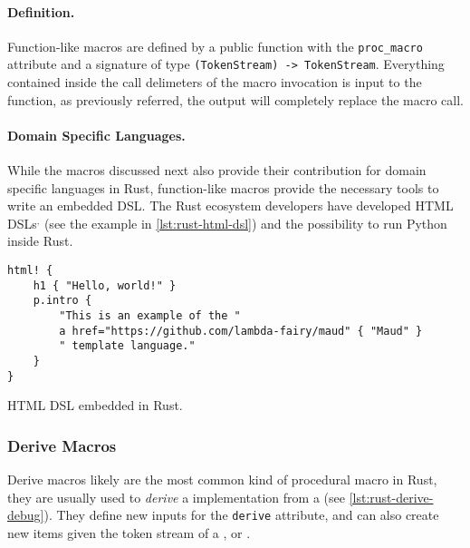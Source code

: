 \paragraph{Definition.}
Function-like macros are defined by a public function with the \texttt{proc\_macro} attribute and
a signature of type \texttt{(TokenStream) -> TokenStream}.
Everything contained inside the call delimeters of the macro invocation is input to the function,
as previously referred, the output will completely replace the macro call.

\paragraph{Domain Specific Languages.}
While the macros discussed next also provide their contribution for domain specific languages in Rust,
function-like macros provide the necessary tools to write an embedded DSL.
The Rust ecosystem developers have developed HTML DSLs$^,$
(see the example in \autoref{lst:rust-html-dsl}) and
the possibility to run Python inside Rust.

% 
\begin{listing}
    \begin{verbatim}
html! {
    h1 { "Hello, world!" }
    p.intro {
        "This is an example of the "
        a href="https://github.com/lambda-fairy/maud" { "Maud" }
        " template language."
    }
}
    \end{verbatim}
    \caption[HTML DSL embedded in Rust.]{HTML DSL embedded in Rust.\footnotemark}
    \label{lst:rust-html-dsl}
\end{listing}

\subsubsection*{Derive Macros}\label{sec:rust-macros:proc:derive}
Derive macros likely are the most common kind of procedural macro in Rust,
they are usually used to \emph{derive} a  implementation from a  (see \autoref{lst:rust-derive-debug}).
They define new inputs for the \texttt{derive} attribute,
and can also create new items given the token stream of a ,  or .


